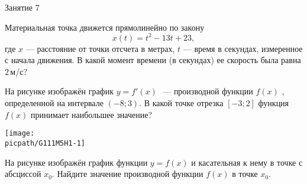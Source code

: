 \begin{class}[number=7]
	\begin{listofex}
		\item Занятие 7
	\end{listofex}
\end{class}

\begin{homework}[number=1]
	\begin{listofex}
		\item Материальная точка движется прямолинейно по закону 
		\[ x(t) = t^2 - 13t + 23, \]
		где \(x\) --- расстояние от точки отсчета в метрах, \(t\) --- время в секундах, измеренное с начала движения. В какой момент времени (в секундах) ее скорость была равна \(2\) м/с?
		\item
		\begin{minipage}[t]{\bodywidth}
			На рисунке изображён график \(y=f'(x)\)   — производной функции \(f(x)\)  , определенной на интервале \((-8; 3)\). В какой точке отрезка \([-3; 2]\) функция \(f(x)\) принимает наибольшее значение?
		\end{minipage}
		\hspace{0.02\linewidth}
		\begin{minipage}[t]{\picwidth}
			\texttt{[image: \\picpath/G111M5H1-1]}
		\end{minipage}
		\item
		\begin{minipage}[t]{\bodywidth}
			На рисунке изображён график функции \(y=f(x)\) и касательная к нему в точке с абсциссой \(x_0\). Найдите значение производной функции \(f(x)\) в точке \(x_0\).
		\end{minipage}
		\hspace{0.02\linewidth}
		\begin{minipage}[t]{\picwidth}

\end{minipage}
\end{listofex}
\end{homework}
